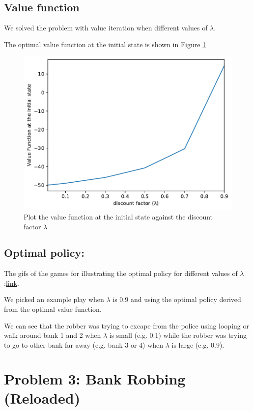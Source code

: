 \documentclass{article}
\begin{document}
\subsection{Value function}
We solved the problem with value iteration when different values of $\lambda$.

The optimal value function at the initial state is shown in Figure \ref{fig:prob2-valfun}

\begin{figure}
  \centering
  \includegraphics[width=.9\linewidth]{prob2_vfunc.pdf}
  \caption{Plot the value function at the initial state against the discount factor $\lambda$}
  \label{fig:prob2-valfun}
\end{figure}

\subsection{Optimal policy:}

The gifs of the games for illustrating the optimal policy for different values of $\lambda$
:\href{https://mega.nz/#F!ojJATAAK!KvsQXmRofJkyiYI9tlqWtA}{link}.

We picked an example play when $\lambda$ is 0.9 and using the optimal policy
derived from the optimal value function.


We can see that the robber was trying to excape from the police using
looping or walk around bank 1 and 2 when $\lambda$ is small (e.g. 0.1)
while the robber was trying to go to other bank
far away (e.g. bank 3 or 4) when $\lambda$ is large (e.g. 0.9).

\section{Problem 3: Bank Robbing (Reloaded)}
\end{document}
